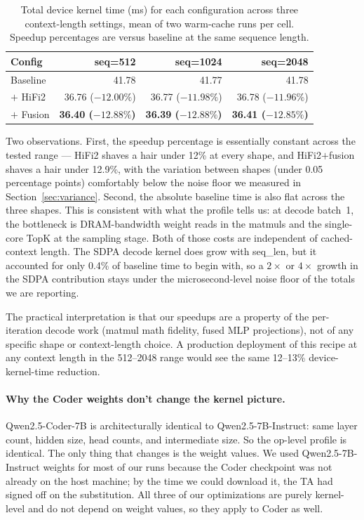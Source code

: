 \documentclass[sigplan,nonacm]{acmart}
\begin{document}
\begin{table}[h]
\centering
\small
\setlength{\tabcolsep}{4pt}
\caption{Total device kernel time (ms) for each configuration across
three context-length settings, mean of two warm-cache runs per cell.
Speedup percentages are versus baseline at the same sequence length.}
\label{tab:shape-sweep}
\begin{tabular}{lrrr}
\toprule
Config & seq=512 & seq=1024 & seq=2048 \\
\midrule
Baseline   & 41.78 & 41.77 & 41.78 \\
$+$ HiFi2  & 36.76 (${-}12.00\%$) & 36.77 (${-}11.98\%$) & 36.78 (${-}11.96\%$) \\
$+$ Fusion & \textbf{36.40 (${-}12.88\%$)} & \textbf{36.39 (${-}12.88\%$)} & \textbf{36.41 (${-}12.85\%$)} \\
\bottomrule
\end{tabular}
\end{table}

Two observations. First, the speedup percentage is essentially
constant across the tested range --- HiFi2 shaves a hair under 12\%
at every shape, and HiFi2$+$fusion shaves a hair under 12.9\%, with
the variation between shapes (under 0.05 percentage points)
comfortably below the noise floor we measured in
Section~\ref{sec:variance}. Second, the absolute baseline time is
also flat across the three shapes. This is consistent with what the
profile tells us: at decode batch~1, the bottleneck is DRAM-bandwidth
weight reads in the matmuls and the single-core TopK at the sampling
stage. Both of those costs are independent of cached-context length.
The SDPA decode kernel does grow with seq\_len, but it accounted for
only 0.4\% of baseline time to begin with, so a $2\times$ or
$4\times$ growth in the SDPA contribution stays under the
microsecond-level noise floor of the totals we are reporting.

The practical interpretation is that our speedups are a property of
the per-iteration decode work (matmul math fidelity, fused MLP
projections), not of any specific shape or context-length choice.
A production deployment of this recipe at any context length in the
512--2048 range would see the same 12--13\% device-kernel-time
reduction.

\paragraph{Why the Coder weights don't change the kernel picture.}
Qwen2.5-Coder-7B is architecturally identical to
Qwen2.5-7B-Instruct: same layer count, hidden size, head counts, and
intermediate size. So the op-level profile is identical. The only
thing that changes is the weight values. We used
Qwen2.5-7B-Instruct weights for most of our runs because the Coder
checkpoint was not already on the host machine; by the time we could
download it, the TA had signed off on the substitution.
All three of our optimizations are purely kernel-level and do not
depend on weight values, so they apply to Coder as well.
\end{document}
